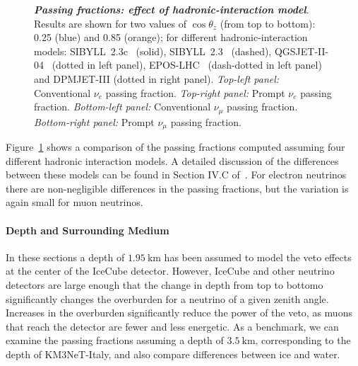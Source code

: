 \begin{figure}[h!]
{	}
	\caption{\textbf{\textit{Passing fractions: effect of hadronic-interaction model}}. Results are shown for two values of $\cos\theta_z$ (from top to bottom): 0.25 (blue) and 0.85 (orange); for different hadronic-interaction models: SIBYLL~2.3c~\cite{Riehn:2017mfm} (solid), SIBYLL~2.3~\cite{Engel:2015dxa, Riehn:2015oba} (dashed), QGSJET-II-04~\cite{Ostapchenko:2010vb} (dotted in left panel), EPOS-LHC~\cite{Pierog:2013ria} (dash-dotted in left panel) and DPMJET-III\cite{Roesler:2000he} (dotted in right panel).
		\textit{Top-left panel:} Conventional $\nu_e$ passing fraction. \textit{Top-right panel:} Prompt $\nu_e$ passing fraction. \textit{Bottom-left panel:} Conventional $\nu_\mu$ passing fraction. \textit{Bottom-right panel:} Prompt $\nu_\mu$ passing fraction.} \vspace{1cm}
	\label{fig:nue-hadronic-model-effect}
\end{figure}

Figure~\ref{fig:nue-hadronic-model-effect} shows a comparison of the passing fractions computed assuming four different hadronic interaction models.
A detailed discussion of the differences between these models can be found in Section IV.C of~\cite{Arguelles:2018awr}.
For electron neutrinos there are non-negligible differences in the passing fractions, but the variation is again small for muon neutrinos.

\paragraph{Depth and Surrounding Medium}
In these sections a depth of $\SI{1.95}\km$ has been assumed to model the veto effects at the center of the IceCube detector.
However, IceCube and other neutrino detectors are large enough that the change in depth from top to bottomo significantly changes the overburden for a neutrino of a given zenith angle.
Increases in the overburden significantly reduce the power of the veto, as muons that reach the detector are fewer and less energetic.
As a benchmark, we can examine the passing fractions assuming a depth of $\SI{3.5}\km$, corresponding to the depth of KM3NeT-Italy, and also compare differences between ice and water.

